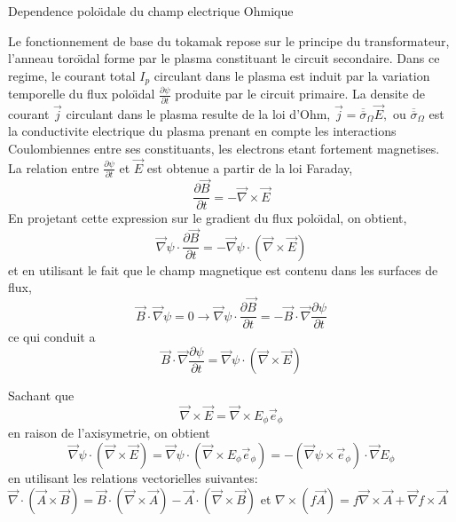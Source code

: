 Dependence polo\"{\i}dale du champ electrique Ohmique

Le fonctionnement de base du tokamak repose sur le principe du transformateur,
l'anneau toro\"{\i}dal forme par le plasma constituant le circuit
secondaire. Dans ce regime, le courant total $I_{p}$ circulant dans
le plasma est induit par la variation temporelle du flux polo\"{\i}dal
$\frac{\partial\psi}{\partial t}$ produite par le circuit primaire.
La densite de courant $\overrightarrow{j}$ circulant dans le plasma
resulte de la loi d'Ohm, $\overrightarrow{j}=\overline{\overline{\sigma}}_{\Omega}\overrightarrow{E},$
ou $\overline{\overline{\sigma}}_{\Omega}$ est la conductivite electrique
du plasma prenant en compte les interactions Coulombiennes entre ses
constituants, les electrons etant fortement magnetises. La relation
entre $\frac{\partial\psi}{\partial t}$ et $\overrightarrow{E}$
est obtenue a partir de la loi Faraday, \[
\frac{\partial\overrightarrow{B}}{\partial t}=-\overrightarrow{\nabla}\times\overrightarrow{E}\]
 En projetant cette expression sur le gradient du flux polo\"{\i}dal,
on obtient, \[
\overrightarrow{\nabla}\psi\cdot\frac{\partial\overrightarrow{B}}{\partial t}=-\overrightarrow{\nabla}\psi\cdot\left(\overrightarrow{\nabla}\times\overrightarrow{E}\right)\]
 et en utilisant le fait que le champ magnetique est contenu dans
les surfaces de flux, \[
\overrightarrow{B}\cdot\overrightarrow{\nabla}\psi=0\rightarrow\overrightarrow{\nabla}\psi\cdot\frac{\partial\overrightarrow{B}}{\partial t}=-\overrightarrow{B}\cdot\overrightarrow{\nabla}\frac{\partial\psi}{\partial t}\]
 ce qui conduit a \[
\overrightarrow{B}\cdot\overrightarrow{\nabla}\frac{\partial\psi}{\partial t}=\overrightarrow{\nabla}\psi\cdot\left(\overrightarrow{\nabla}\times\overrightarrow{E}\right)\]


Sachant que \[
\overrightarrow{\nabla}\times\overrightarrow{E}=\overrightarrow{\nabla}\times E_{\phi}\overrightarrow{e}_{\phi}\]
 en raison de l'axisymetrie, on obtient\[
\overrightarrow{\nabla}\psi\cdot\left(\overrightarrow{\nabla}\times\overrightarrow{E}\right)=\overrightarrow{\nabla}\psi\cdot\left(\overrightarrow{\nabla}\times E_{\phi}\overrightarrow{e}_{\phi}\right)=-\left(\overrightarrow{\nabla}\psi\times\overrightarrow{e}_{\phi}\right)\cdot\overrightarrow{\nabla}E_{\phi}\]
en utilisant les relations vectorielles suivantes: $\overrightarrow{\nabla}\cdot\left(\overrightarrow{A}\times\overrightarrow{B}\right)=\overrightarrow{B}\cdot\left(\overrightarrow{\nabla}\times\overrightarrow{A}\right)-\overrightarrow{A}\cdot\left(\overrightarrow{\nabla}\times\overrightarrow{B}\right)$
et $\nabla\times\left(f\overrightarrow{A}\right)=f\overrightarrow{\nabla}\times\overrightarrow{A}+\overrightarrow{\nabla}f\times\overrightarrow{A}$

